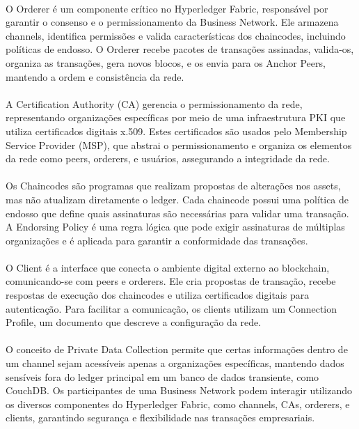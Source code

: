 \documentclass[letterpaper,11pt,leqno]{article}
\begin{document}
\paragraph{}
O Orderer é um componente crítico no Hyperledger Fabric, responsável por
garantir o consenso e o permissionamento da Business Network. Ele armazena
channels, identifica permissões e valida características dos chaincodes,
incluindo políticas de endosso. O Orderer recebe pacotes de transações
assinadas, valida-os, organiza as transações, gera novos blocos, e os envia para
os Anchor Peers, mantendo a ordem e consistência da rede.

\paragraph{}
A Certification Authority (CA) gerencia o permissionamento da rede,
representando organizações específicas por meio de uma infraestrutura PKI que
utiliza certificados digitais x.509. Estes certificados são usados pelo
Membership Service Provider (MSP), que abstrai o permissionamento e organiza os
elementos da rede como peers, orderers, e usuários, assegurando a integridade da
rede.

\newpage{}

\paragraph{}
Os Chaincodes são programas que realizam propostas de alterações nos assets, mas
não atualizam diretamente o ledger. Cada chaincode possui uma política de
endosso que define quais assinaturas são necessárias para validar uma transação.
A Endorsing Policy é uma regra lógica que pode exigir assinaturas de múltiplas
organizações e é aplicada para garantir a conformidade das transações.

\paragraph{}
O Client é a interface que conecta o ambiente digital externo ao blockchain,
comunicando-se com peers e orderers. Ele cria propostas de transação, recebe
respostas de execução dos chaincodes e utiliza certificados digitais para
autenticação. Para facilitar a comunicação, os clients utilizam um Connection
Profile, um documento que descreve a configuração da rede.

\paragraph{}
O conceito de Private Data Collection permite que certas informações dentro de
um channel sejam acessíveis apenas a organizações específicas, mantendo dados
sensíveis fora do ledger principal em um banco de dados transiente, como
CouchDB. Os participantes de uma Business Network podem interagir utilizando os
diversos componentes do Hyperledger Fabric, como channels, CAs, orderers, e
clients, garantindo segurança e flexibilidade nas transações empresariais.

% 
\end{document}
